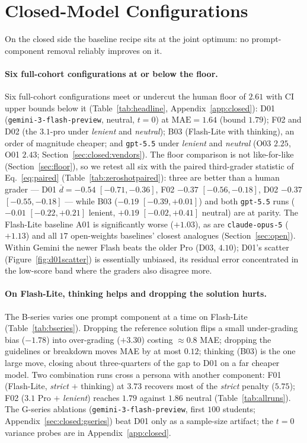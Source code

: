 \section{Closed-Model Configurations}
\label{sec:closed}

On the closed side the baseline recipe sits at the joint optimum: no prompt-component removal reliably improves on it.

\paragraph{Six full-cohort configurations at or below the floor.}
Six full-cohort configurations meet or undercut the human floor of $2.61$ with CI upper bounds below it (Table~\ref{tab:headline}, Appendix~\ref{app:closed}): D01 (\texttt{gemini-3-flash-preview}, neutral, $t = 0$) at $\text{MAE} = 1.64$ (bound $1.79$); F02 and D02 (the $3.1$-pro under \emph{lenient} and \emph{neutral}); B03 (Flash-Lite with thinking), an order of magnitude cheaper; and \texttt{gpt-5.5} under \emph{lenient} and \emph{neutral} (O03 $2.25$, O01 $2.43$; Section~\ref{sec:closed:vendors}). The floor comparison is not like-for-like (Section~\ref{sec:floor}), so we retest all six with the paired third-grader statistic of Eq.~\eqref{eq:paired} (Table~\ref{tab:zeroshotpaired}): three are better than a human grader --- D01 $\overline{d} = -0.54$ $[-0.71, -0.36]$, F02 $-0.37$ $[-0.56, -0.18]$, D02 $-0.37$ $[-0.55, -0.18]$ --- while B03 ($-0.19$ $[-0.39, +0.01]$) and both \texttt{gpt-5.5} runs ($-0.01$ $[-0.22, +0.21]$ lenient, $+0.19$ $[-0.02, +0.41]$ neutral) are at parity. The Flash-Lite baseline A01 is significantly worse ($+1.03$), as are \texttt{claude-opus-5} ($+1.13$) and all $17$ open-weights baselines' closest analogues (Section~\ref{sec:open}). Within Gemini the newer Flash beats the older Pro (D03, $4.10$); D01's scatter (Figure~\ref{fig:d01scatter}) is essentially unbiased, its residual error concentrated in the low-score band where the graders also disagree more.

\paragraph{On Flash-Lite, thinking helps and dropping the solution hurts.}
The B-series varies one prompt component at a time on Flash-Lite (Table~\ref{tab:bseries}). Dropping the reference solution flips a small under-grading bias ($-1.78$) into over-grading ($+3.30$) costing $\approx 0.8$ MAE; dropping the guidelines or breakdown moves MAE by at most $0.12$; thinking (B03) is the one large move, closing about three-quarters of the gap to D01 on a far cheaper model. Two combination runs cross a persona with another component: F01 (Flash-Lite, \emph{strict} $+$ thinking) at $3.73$ recovers most of the \emph{strict} penalty ($5.75$); F02 ($3.1$ Pro $+$ \emph{lenient}) reaches $1.79$ against $1.86$ neutral (Table~\ref{tab:allruns}). The G-series ablations (\texttt{gemini-3-flash-preview}, first $100$ students; Appendix~\ref{sec:closed:gseries}) beat D01 only as a sample-size artifact; the $t = 0$ variance probes are in Appendix~\ref{app:closed}.

